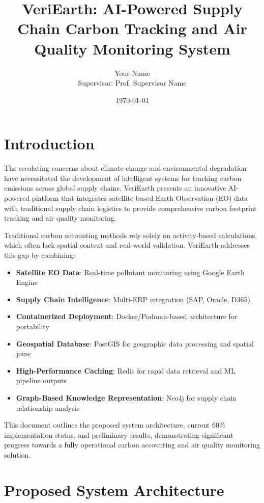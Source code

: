 \documentclass[11pt,a4paper]{article}
\title{VeriEarth: AI-Powered Supply Chain Carbon Tracking and Air Quality Monitoring System}
\author{Your Name \\ Supervisor: Prof. Supervisor Name}
\date{\today}
\begin{document}
\maketitle

\section{Introduction}

The escalating concerns about climate change and environmental degradation have necessitated the development of intelligent systems for tracking carbon emissions across global supply chains. VeriEarth presents an innovative AI-powered platform that integrates satellite-based Earth Observation (EO) data with traditional supply chain logistics to provide comprehensive carbon footprint tracking and air quality monitoring.

Traditional carbon accounting methods rely solely on activity-based calculations, which often lack spatial context and real-world validation. VeriEarth addresses this gap by combining:

\begin{itemize}
    \item \textbf{Satellite EO Data}: Real-time pollutant monitoring using Google Earth Engine
    \item \textbf{Supply Chain Intelligence}: Multi-ERP integration (SAP, Oracle, D365)
    \item \textbf{Containerized Deployment}: Docker/Podman-based architecture for portability
    \item \textbf{Geospatial Database}: PostGIS for geographic data processing and spatial joins
    \item \textbf{High-Performance Caching}: Redis for rapid data retrieval and ML pipeline outputs
    \item \textbf{Graph-Based Knowledge Representation}: Neo4j for supply chain relationship analysis
\end{itemize}

This document outlines the proposed system architecture, current 60\% implementation status, and preliminary results, demonstrating significant progress towards a fully operational carbon accounting and air quality monitoring solution.

\section{Proposed System Architecture}
\end{document}
